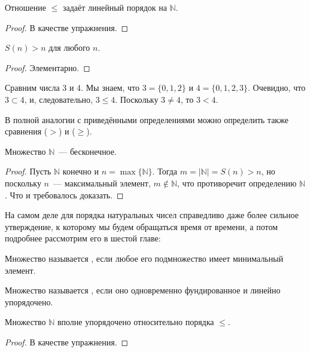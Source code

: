 \begin{thm}
Отношение $\le$ задаёт линейный порядок на $\mathbb{N}$.
\end{thm}
\begin{proof}В качестве упражнения.\end{proof}

\begin{thm}
$S(n) > n$ для любого $n$.
\end{thm}
\begin{proof}
Элементарно.
\end{proof}

\begin{example}
Сравним числа 3 и 4. Мы знаем, что $3 = \{0, 1, 2\}$ и $4 = \{0, 1, 2, 3\}$. Очевидно, что $3\subset 4$, и, следовательно, $3\le4$. Поскольку $3\not= 4$, то $3<4$.
\end{example}

В полной аналогии с приведёнными определениями можно определить также сравнения  ($>$) и  ($\ge$).

\begin{thm}
Множество $\mathbb{N}$~— бесконечное.
\end{thm}
\begin{proof}
Пусть $\mathbb{N}$ конечно и $n = \max\{\mathbb{N}\}$. Тогда $m = |\mathbb{N}| = S(n) > n$, но поскольку $n$~— максимальный элемент, $m\not\in\mathbb{N}$, что противоречит определению $\mathbb{N}$. Что и требовалось доказать.
\end{proof}

На самом деле для порядка натуральных чисел справедливо даже более сильное утверждение, к которому мы будем обращаться время от времени, а потом подробнее рассмотрим его в шестой главе:

\begin{definition}
Множество называется , если любое его подмножество имеет минимальный элемент.
\end{definition}

\begin{definition}
Множество называется , если оно одновременно фундированное и линейно упорядочено.
\end{definition}

\begin{thm}
Множество $\mathbb{N}$ вполне упорядочено относительно порядка $\le$.
\end{thm}
\begin{proof}
В качестве упражнения.
\end{proof}

